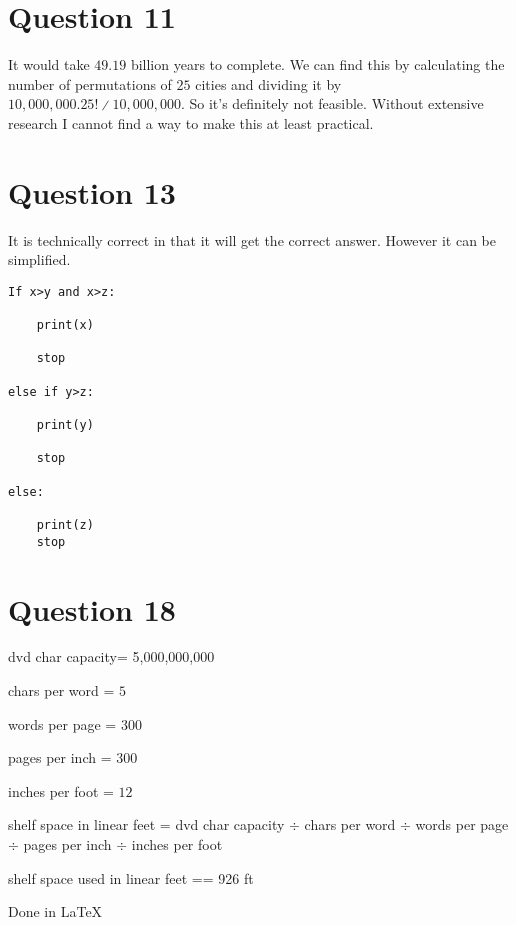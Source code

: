 \documentclass{article}%
\begin{document}
\section{Question 11}
It would take $49.19$ billion years to complete. We can find this by calculating the number of permutations of $25$ cities and dividing it by $10,000,000. 25! ∕ 10,000,000$. So it’s definitely not feasible. Without extensive research I cannot find a way to make this at least practical.
\clearpage

\section{Question 13}
It is technically correct in that it will get the correct answer. However it can be simplified. 
\begin{lstlisting}
If x>y and x>z:

	print(x)

	stop 

else if y>z:

	print(y)

	stop

else:

	print(z)
	stop
\end{lstlisting}

\section{Question 18}
dvd char capacity= 5,000,000,000

chars per word = $5$

words per page = $300$

pages per inch = $300$

inches per foot = $12$

shelf space in linear feet = dvd char capacity $\div$ chars per word $\div$ words per page $\div$ pages per inch $\div$ inches per foot

shelf space used in linear feet == 926 ft \newline \newline


\vspace*{0.5in}
\noindent Done in LaTeX
\end{document}
